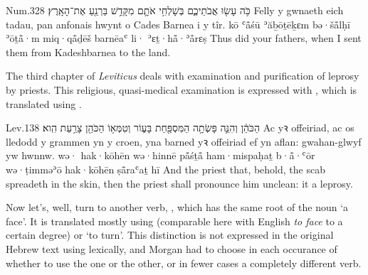 \begin{example}{Num.}{32}{8}{}{}
	\quoling
	{כֹּ֥ה עָשׂ֖וּ אֲבֹתֵיכֶ֑ם בְּשָׁלְחִ֥י אֹתָ֛ם מִקָּדֵ֥שׁ בַּרְנֵ֖עַ  אֶת־הָאָֽרֶץ׃}
	{Felly y gwnaeth eich tadau, pan anfonais hwynt o Cades Barnea i  y tîr.}
	{kō ʿå̄śū ʾăḇōṯēḵɛm bə·šå̄lḥī ʾōṯå̄·m miq·qå̄ḏēš barnēaʿ li· ʾɛṯ·hå̄·ʾå̄rɛṣ}
	{Thus did your fathers, when I sent them from Kadeshbarnea to  the land.}
\end{example}




\begin{paper}
	The third chapter of \emph{Leviticus} deals with examination and purification of leprosy by priests. This religious, quasi-medical examination is expressed with , which is translated using .
\end{paper}

\begin{example}{Lev.}{13}{8}{}{}
	\quoling
	{ הַכֹּהֵ֔ן וְהִנֵּ֛ה פָּשְׂתָ֥ה הַמִּסְפַּ֖חַת בָּע֑וֹר וְטִמְּא֥וֹ הַכֹּהֵ֖ן צָרַ֥עַת הִֽוא׃}
	{Ac  yꝛ offeiriad, ac os lledodd y grammen yn y croen, yna barned yꝛ offeiriad ef yn aflan: gwahan-glwyf yw hwnnw.}
	{wə· hak·kōhēn wə·hinnē på̄śṯå̄ ham·mispaḥaṯ b·å̄·ʿōr wə·ṭimməʾō hak·kōhēn ṣå̄raʿaṯ hī}
	{And  the priest  that, behold, the scab spreadeth in the skin, then the priest shall pronounce him unclean: it  a leprosy.}
\end{example}







\begin{paper}
	Now let’s, well, turn to another verb, , which has the same root of the noun  ‘a face’. It is translated mostly using  (comparable here with English \textit{to face} to a certain degree) or  ‘to turn’. This distinction is not expressed in the original Hebrew text using lexically, and Morgan had to choose in each occurance of  whether to use the one or the other, or in fewer cases a completely different verb.
\end{paper}


